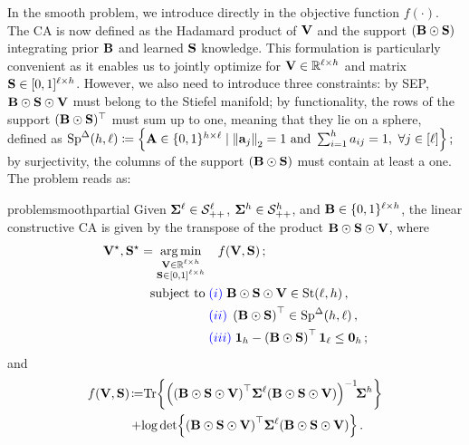 In the smooth problem, we introduce \B directly in the objective function $f(\cdot)$. The CA is now defined as the Hadamard product of $\mathbf{V}$ and the support $(\mathbf{B} \odot \mathbf{S})$ integrating prior $\mathbf{B}$ and learned $\mathbf{S}$ knowledge. 
This formulation is particularly convenient as it enables us to jointly optimize for $\mathbf{V} \in \mathbb{R}^{\ell \times h}$ and matrix $\mathbf{S} \in [0,1]^{\ell \times h}$. However, we also need to introduce three constraints: 
 by SEP, $\mathbf{B} \odot \mathbf{S} \odot \mathbf{V}$ must belong to the Stiefel manifold; 
 by functionality, the rows of the support $(\mathbf{B} \odot \mathbf{S})^\top$ must sum up to one, meaning that they lie on a sphere, defined as $\mathrm{Sp}^{\Delta}({h},{\ell}) \coloneqq \Big\{\mathbf{A} \in \{0,1\}^{h\times\ell} \mid  \norm{\mathbf{a}_j}_2=1 \text{ and } \sum_{i=1}^h a_{ij}=1,\,\,\forall j \in [\ell]  \Big\}\,;$  by surjectivity, the columns of the support $(\mathbf{B} \odot \mathbf{S})$ must contain at least a one. 
The problem reads as:
\begin{restatable}{problem}{smoothpartial}\label{prob:nonconvex_prob_approx}
Given $\boldsymbol{\Sigma}^{\ell} \in \mathcal{S}_{++}^{\ell}$, $\boldsymbol{\Sigma}^{h} \in \mathcal{S}_{++}^{h}$, and $\mathbf{B} \in \{0,1\}^{\ell \times h}$, the linear constructive CA is given by the transpose of the product $\mathbf{B} \odot \mathbf{S} \odot \mathbf{V}$, where 
    \begin{equation}\label{eq:prob_madmmsca_VS}
        \begin{aligned}
            \mathbf{V}^\star, \mathbf{S}^\star = \operatorname*{arg\,min}_{\substack{\mathbf{V} \in \mathbb{R}^{\ell \times h} \\ \mathbf{S} \in [0,1]^{\ell \times h}}} &\quad f(\mathbf{V},\mathbf{S})\,;\\
             \textrm{subject to} & \; \textcolor{blue}{(i)}\; \mathbf{B} \odot \mathbf{S} \odot \mathbf{V} \in \mathrm{St}({\ell},{h})\,, \\
             & \; \textcolor{blue}{(ii)}\; \left(\mathbf{B} \odot \mathbf{S}\right)^\top \in \mathrm{Sp}^{\Delta}({h},{\ell})\,, \\
             & \; \textcolor{blue}{(iii)}\; \boldsymbol{1}_h - \left(\mathbf{B} \odot \mathbf{S}\right)^\top \boldsymbol{1}_\ell \leq \boldsymbol{0}_h\,;
        \end{aligned}
    \end{equation}
    and
    \begin{equation}\label{eq:objective_partial_knowledge}
        \begin{aligned}
            f(\V,\Supp) \!\coloneqq\! & \Tr{\left(\left(\B \odot \Supp \odot \V\right)^\top\! \covlow \!\left(\B \odot \Supp \odot \V\right) \right)^{-1} \!\!\covhigh} \\+ 
            & \!\log\det {\left(\B \odot \Supp \odot\V\right)^\top \! \covlow \! \left(\B \odot \Supp \odot\V\right) }\,.
        \end{aligned}
    \end{equation}
\end{restatable}

